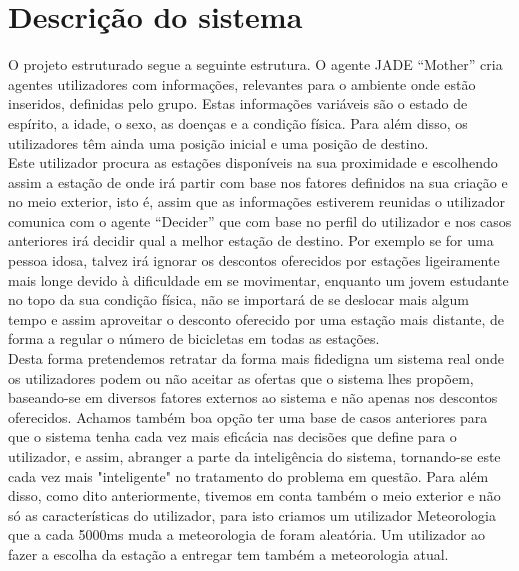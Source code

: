 \section{Descrição do sistema}\label{sec:descricao}

O projeto estruturado segue a seguinte estrutura. O agente JADE “Mother” cria agentes utilizadores com informações, relevantes para o ambiente onde estão inseridos, definidas pelo grupo. Estas informações variáveis são o estado de espírito, a idade, o sexo, as doenças e a condição física. Para além disso, os utilizadores têm ainda uma posição inicial e uma posição de destino.
\\
Este utilizador procura as estações disponíveis na sua proximidade e escolhendo assim a estação de onde irá partir com base nos fatores definidos na sua criação e no meio exterior, isto é, assim que as informações estiverem reunidas o utilizador comunica com o agente “Decider” que com base no perfil do utilizador e nos casos anteriores irá decidir qual a melhor estação de destino.
Por exemplo se for uma pessoa idosa, talvez irá ignorar os descontos oferecidos por estações ligeiramente mais longe devido à dificuldade em se movimentar, enquanto um jovem estudante no topo da sua condição física, não se importará de se deslocar mais algum tempo e assim aproveitar o desconto oferecido por uma estação mais distante, de forma a regular o número de bicicletas em todas as estações.
\\
Desta forma pretendemos retratar da forma mais fidedigna um sistema real onde os utilizadores podem ou não aceitar as ofertas que o sistema lhes propõem, baseando-se em diversos fatores externos ao sistema e não apenas nos descontos oferecidos.
Achamos também boa opção ter uma base de casos anteriores para que o sistema tenha cada vez mais eficácia nas decisões que define para o utilizador, e assim, abranger a parte da inteligência do sistema, tornando-se este cada vez mais "inteligente" no tratamento do problema em questão.
Para além disso, como dito anteriormente, tivemos em conta também o meio exterior e não só as características do utilizador, para isto criamos um utilizador Meteorologia que a cada 5000ms muda a meteorologia de foram aleatória. Um utilizador ao fazer a escolha da estação a entregar tem também a meteorologia atual.